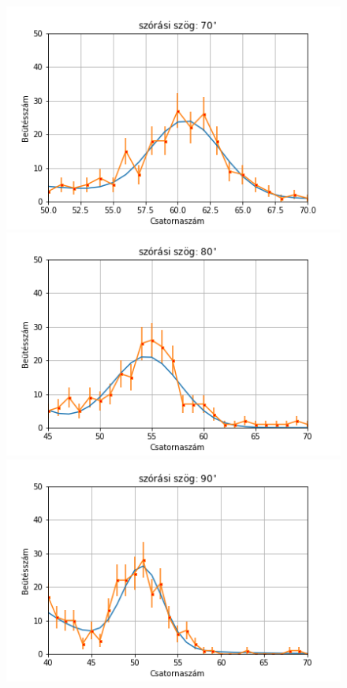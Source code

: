 \documentclass[a4paper,12pt]{article}
\begin{document}
\begin{figure}[!htb]
    \begin{minipage}{.49\textwidth}
        \centering
        \includegraphics[width=1.\linewidth]{../plots/withbackground/70_1166fit.png}
    \end{minipage}%
    \begin{minipage}{.49\textwidth}
        \centering
        \includegraphics[width=1.\linewidth]{../plots/withbackground/80_1100fit.png}
    \end{minipage}
    \begin{minipage}{.49\textwidth}
        \centering
        \includegraphics[width=1.\linewidth]{../plots/withbackground/90_977fit.png}

\end{minipage}
\end{figure}
\end{document}
